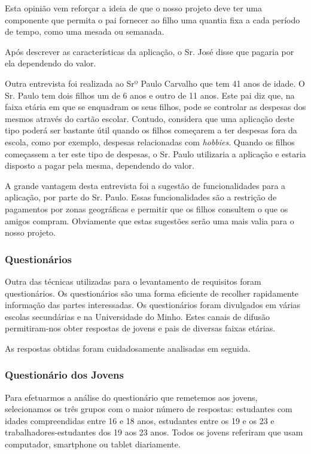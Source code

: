 \documentclass{article}
\begin{document}
      Esta opinião vem reforçar a ideia de que o nosso projeto deve ter uma componente que permita o pai fornecer ao filho uma quantia fixa a cada período de tempo, como uma mesada ou semanada.

      Após descrever as características da aplicação, o Sr. José disse que pagaria por ela dependendo do valor.

      Outra entrevista foi realizada ao Srº Paulo Carvalho que tem 41 anos de idade. O Sr. Paulo tem dois filhos um de 6 anos e outro de 11 anos. Este pai diz que, na faixa etária em que se enquadram os seus filhos, pode se controlar as despesas dos mesmos através do cartão escolar. Contudo, considera que uma aplicação deste tipo poderá ser bastante útil quando os filhos começarem a ter despesas fora da escola, como por exemplo, despesas relacionadas com \emph{hobbies}. Quando os filhos começassem a ter este tipo de despesas, o Sr. Paulo utilizaria a aplicação e estaria disposto a pagar pela mesma, dependendo do valor.

      A grande vantagem desta entrevista foi a sugestão de funcionalidades para a aplicação, por parte do Sr. Paulo. Essas funcionalidades são a restrição de pagamentos por zonas geográficas e permitir que os filhos consultem o que os amigos compram. Obviamente que estas sugestões serão uma mais valia para o nosso projeto.

    \subsubsection{Questionários}
      Outra das técnicas utilizadas para o levantamento de requisitos foram questionários. Os questionários são uma forma eficiente de recolher rapidamente informação das partes interessadas. Os questionários foram divulgados em várias escolas secundárias e na Universidade do Minho. Estes canais de difusão permitiram-nos obter respostas de jovens e pais de diversas faixas etárias.

      As respostas obtidas foram cuidadosamente analisadas em seguida.

    \subsubsection{Questionário dos Jovens}

      Para efetuarmos a análise do questionário que remetemos aos jovens, selecionamos os três grupos com o maior número de respostas: estudantes com idades compreendidas entre 16 e 18 anos, estudantes entre os 19 e os 23 e trabalhadores-estudantes dos 19 aos 23 anos. Todos os jovens referiram que usam computador, smartphone ou tablet diariamente.
\end{document}
